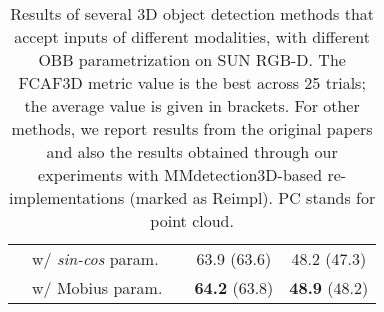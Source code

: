 \documentclass[runningheads]{llncs}
\begin{document}
\begin{table}[h!]
\begin{tabular}{l|c|cc}
    \ \ w/ \textit{sin-cos} param. & & 63.9 (63.6) & 48.2 (47.3) \\
    \ \ w/ Mobius param. & & \textbf{64.2} (63.8) & \textbf{48.9} (48.2) \\ \hline
    \end{tabular}
    \caption{Results of several 3D object detection methods that accept inputs of different modalities, with different OBB parametrization on SUN RGB-D. The FCAF3D metric value is the best across 25 trials; the average value is given in brackets. For other methods, we report results from the original papers and also the results obtained through our experiments with MMdetection3D-based re-implementations (marked as Reimpl). PC stands for point cloud.}
    \label{tab:ablation_priors}
\end{table}

\begin{table}[h!]
    \centering \setlength{\tabcolsep}{2.5pt}
    \caption{Results of fully convolutional 3D object detection methods that accept point clouds on ScanNet. The FCAF3D results better than the results of the original GSDN (with anchors) are marked bold. The all-best results are underlined.}
    \label{tab:ablation_gsdn}
\end{table}
\end{document}
